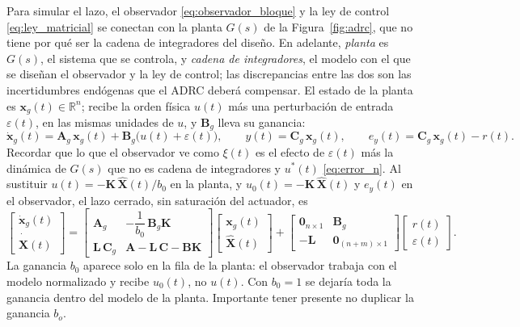 Para simular el lazo, el observador \eqref{eq:observador_bloque} y la ley de
control \eqref{eq:ley_matricial} se conectan con la planta $G(s)$ de la
Figura~\ref{fig:adrc}, que no tiene por qué ser la cadena de integradores del
diseño. En adelante, \emph{planta} es $G(s)$, el sistema que se controla, y
\emph{cadena de integradores}, el modelo con el que se diseñan el observador y la
ley de control; las discrepancias entre las dos son las incertidumbres endógenas
que el ADRC deberá compensar. El estado de la planta es
$\mathbf{x}_g(t) \in \mathbb{R}^{n}$; recibe la orden física $u(t)$ más una
perturbación de entrada $\varepsilon(t)$, en las mismas unidades de $u$, y
$\mathbf{B}_g$ lleva su ganancia:
\begin{equation}
\dot{\mathbf{x}}_g(t) = \mathbf{A}_g\,\mathbf{x}_g(t) + \mathbf{B}_g\bigl(u(t) + \varepsilon(t)\bigr),
\qquad
y(t) = \mathbf{C}_g\,\mathbf{x}_g(t),
\qquad
e_y(t) = \mathbf{C}_g\,\mathbf{x}_g(t) - r(t).
\end{equation}
Recordar que lo que el observador ve como $\xi(t)$ es el efecto de $\varepsilon(t)$ más la
dinámica de $G(s)$ que no es cadena de integradores y $u^*(t)$ \eqref{eq:error_n}. Al sustituir
$u(t) = -\mathbf{K}\,\widehat{\mathbf{X}}(t)/b_0$ en la planta, y
$u_0(t) = -\mathbf{K}\,\widehat{\mathbf{X}}(t)$ y $e_y(t)$ en el observador,
el lazo cerrado, sin saturación del actuador, es
\begin{equation}
\begin{bmatrix} \dot{\mathbf{x}}_g(t) \\ \dot{\widehat{\mathbf{X}}}(t) \end{bmatrix}
=
\begin{bmatrix} \mathbf{A}_g & -\dfrac{1}{b_0}\,\mathbf{B}_g\mathbf{K} \\[0.8em] \mathbf{L}\,\mathbf{C}_g & \mathbf{A} - \mathbf{L}\,\mathbf{C} - \mathbf{B}\mathbf{K} \end{bmatrix}
\begin{bmatrix} \mathbf{x}_g(t) \\ \widehat{\mathbf{X}}(t) \end{bmatrix}
+
\begin{bmatrix} \mathbf{0}_{n \times 1} & \mathbf{B}_g \\ -\mathbf{L} & \mathbf{0}_{(n+m) \times 1} \end{bmatrix}
\begin{bmatrix} r(t) \\ \varepsilon(t) \end{bmatrix}.
\label{eq:lazo_cerrado}
\end{equation}
La ganancia $b_0$ aparece solo en la fila de la planta: el observador trabaja con
el modelo normalizado y recibe $u_0(t)$, no $u(t)$. Con $b_0 = 1$ se dejaría
toda la ganancia dentro del modelo de la planta. Importante tener presente no duplicar la ganancia $b_o$.


